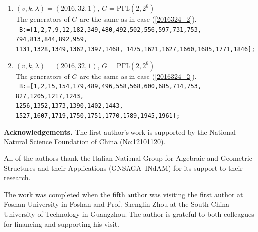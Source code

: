 \documentclass[a4paper,twopage,reqno,12pt]{amsart}
\theoremstyle{definition}
\numberwithin{equation}{section}
\newcommand{\PGaL}{\mathrm{P\Gamma L}}
\newcommand{\Aut}{\mathrm{Aut}}
\begin{document}
\begin{enumerate}
\item\label{20163212_1} $(v,k,\lambda)=(2016,32,1)$, $G=\PGaL(2,2^6)$\\
The generators of $G$ are the same as in case (\ref{2016324_2}). \\
\texttt{ B:=[1,2,7,9,12,182,349,480,492,502,556,597,731,753,
794,813,844,892,959,\\1131,1328,1349,1362,1397,1468,
1475,1621,1627,1660,1685,1771,1846];}\\

\item\label{20163212_2} $(v,k,\lambda)=(2016,32,1)$, $G=\PGaL(2,2^6)$\\
The generators of $G$ are the same as in case (\ref{2016324_2}). \\
\texttt{ B:=[1,2,15,154,179,489,496,558,568,600,685,714,753,
827,1205,1217,1243,\\1256,1352,1373,1390,1402,1443,
1527,1607,1719,1750,1751,1770,1789,1945,1961];}\\
\end{enumerate}


\textbf{Acknowledgements.}
The first author's work is supported by the National Natural Science Foundation of China (No:12101120).

All of the authors thank the Italian National Group for Algebraic and Geometric Structures and their Applications (GNSAGA–INdAM) for its support to their research.

The work was completed when the fifth author was visiting the first author at Foshan University in Foshan and Prof. Shenglin Zhou at the South China University of Technology in Guangzhou. The author is grateful to both colleagues for financing and supporting his visit.
\end{document}

